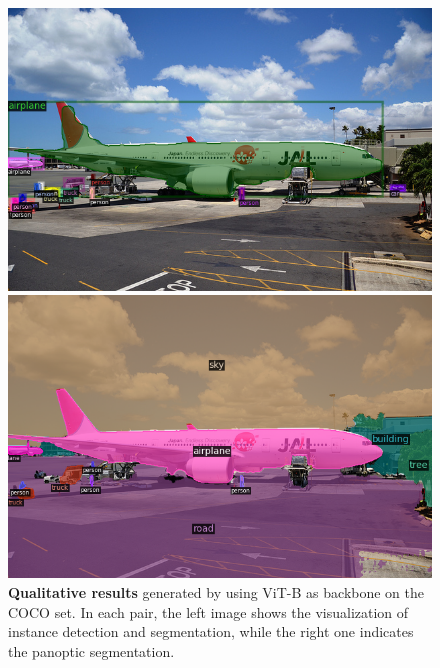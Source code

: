 \begin{figure}[h!]
    \begin{minipage}[b]{.45\linewidth}
    \includegraphics[width=\linewidth]{vis/success/val_129_det.png}
    \end{minipage}
    \begin{minipage}[b]{.45\linewidth}
    \includegraphics[width=\linewidth]{vis/success/val_129_pan.png}
    \end{minipage}
    
    
    \caption{\textbf{Qualitative results} generated by \ours using ViT-B as backbone on the COCO \val set. In each pair, the left image shows the visualization of instance detection and segmentation, while the right one indicates the panoptic segmentation.}
    \label{fig:vis_sup}
\end{figure}


